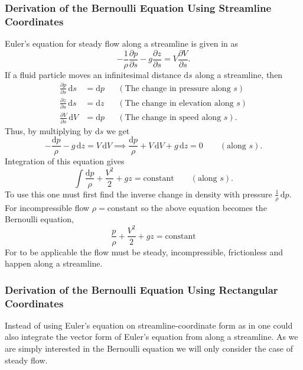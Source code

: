 \subsubsection{Derivation of the Bernoulli Equation Using Streamline Coordinates} \label{sec:bernstre}
Euler's equation for steady flow along a streamline is given in  as
\[ 
- \frac{1}{\rho} \frac{\partial p}{\partial s} - g \frac{\partial z}{\partial s} = V \frac{\partial V}{\partial s}
.\]
If a fluid particle moves an infinitesimal distance $\mathrm{d}s$ along a streamline, then
\begin{align*}
  \frac{\partial p}{\partial s} \, \mathrm{d}s &= \mathrm{d}p & &(\text{The change in pressure along } s) \\
  \frac{\partial z}{\partial s} \, \mathrm{d}s &= \mathrm{d}z & &(\text{The change in elevation along } s) \\
  \frac{\partial V}{\partial s} \, \mathrm{d}V &= \mathrm{d}p & &(\text{The change in speed along } s)
.\end{align*}
Thus, by multiplying  by $\mathrm{d}s$ we get
\[ 
- \frac{\mathrm{d}p}{\rho} - g \, \mathrm{d}z = V \, \mathrm{d}V \implies \frac{\mathrm{d}p}{\rho} + V \, \mathrm{d}V + g \, \mathrm{d}z = 0 \qquad (\text{along } s)
.\]
Integration of this equation gives
\[ 
\int \frac{\mathrm{d}p}{\rho} + \frac{V^2}{2} + gz = \mathrm{constant} \qquad (\text{along } s)
.\]
To use this one must first find the inverse change in density with pressure $\frac{1}{\rho} \, \mathrm{d}p$. For incompressible flow $\rho = \mathrm{constant}$ so the above equation becomes the Bernoulli equation,
\begin{equation} \label{eq:berneq}
  \frac{p}{\rho} + \frac{V^2}{2} + gz = \mathrm{constant}
\end{equation}
For  to be applicable the flow must be steady, incompressible, frictionless and happen along a streamline. 


\subsubsection{Derivation of the Bernoulli Equation Using Rectangular Coordinates}
Instead of using Euler's equation on streamline-coordinate form as in  one could also integrate the vector form of Euler's equation from  along a streamline. As we are simply interested in the Bernoulli equation we will only consider the case of steady flow.

